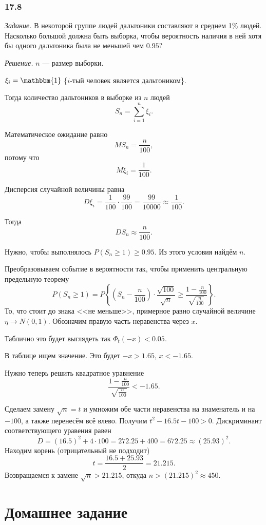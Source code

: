 \subsubsection*{17.8}

\textit{Задание.} В некоторой группе людей дальтоники составляют в среднем 1\% людей.
Насколько большой должна быть выборка,
чтобы вероятность наличия в ней хотя бы одного дальтоника была не меньшей чем $0.95$?

\textit{Решение.} $n$ --- размер выборки.

$ \xi_i = \mathbbm{1}$ \{$i$-тый человек является дальтоником\}.

Тогда количество дальтоников в выборке из $n$ людей
$$S_n =
  \sum \limits_{i = 1}^n \xi_i.$$

Математическое ожидание равно
$$MS_n =
  \frac{n}{100},$$
потому что
$$M \xi_i =
  \frac{1}{100}.$$

Дисперсия случайной величины равна
$$D \xi_i =
  \frac{1}{100} \cdot \frac{99}{100} =
  \frac{99}{10000} \approx
  \frac{1}{100}.$$

Тогда
$$DS_n \approx
  \frac{n}{100}.$$

Нужно, чтобы выполнялось $P \left( S_n \geq 1 \right) \geq 0.95$.
Из этого условия найдём $n$.

Преобразовываем событие в вероятности так, чтобы применить центральную предельную теорему
$$P \left( S_n \geq 1 \right) =
  P \left\{
    \left( S_n - \frac{n}{100} \right) \cdot \frac{ \sqrt{100}}{\sqrt{n}} \geq
    \frac{1 - \frac{n}{100}}{ \sqrt{ \frac{n}{100}}}
  \right\}.$$
То, что стоит до знака <<не меньше>>, примерное равно случайной величине
$ \eta \to N \left( 0, 1 \right) $.
Обозначим правую часть неравенства через $x$.

Таблично это будет выглядеть так $ \Phi_t \left( -x \right) < 0.05$.

В таблице ищем значение.
Это будет $-x > 1.65, \, x < -1.65$.

Нужно теперь решить квадратное уравнение
$$ \frac{1 - \frac{n}{100}}{ \sqrt{ \frac{n}{100}}} < -1.65.$$

Сделаем замену $ \sqrt{n} = t$ и умножим обе части неравенства на знаменатель и на $-100$,
а также перенесём всё влево.
Получим $t^2 - 16.5t - 100 > 0$.
Дискриминант соответствующего уравения равен
$$D =
  \left( 16.5 \right)^2 + 4 \cdot 100 =
  272.25 + 400 =
  672.25 \approx
  \left( 25.93 \right)^2.$$
Находим корень (отрицательный не подходит)
$$t =
  \frac{16.5 + 25.93}{2} =
  21.215.$$
Возвращаемся к замене $ \sqrt{n} > 21.215$, откуда $n >  \left( 21.215 \right)^2 \approx 450$.

\section*{Домашнее задание}
